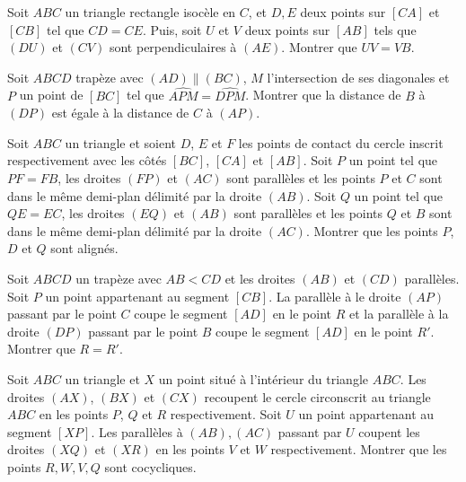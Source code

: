 \begin{exo}%
Soit $ABC$ un triangle rectangle isocèle en $C$, et $D,E$ deux points sur $[CA]$ et $[CB]$ tel que $CD = CE$. Puis, soit $U$ et $V$ deux points sur $[AB]$ tels que $(DU)$ et $(CV)$ sont perpendiculaires à $(AE)$. Montrer que $UV = VB$.
\end{exo}


\begin{exo}%
Soit $ABCD$ trapèze avec $(AD) \parallel (BC)$, $M$ l’intersection de ses diagonales et $P$ un point de $[BC]$ tel que $\widehat{APM} = \widehat{DPM}$. Montrer que la distance de $B$ à $(DP)$ est égale à la distance de $C$ à $(AP)$.
\end{exo}


\begin{exo}%
Soit $ABC$ un triangle et soient $D$, $E$ et $F$ les points de contact du cercle inscrit respectivement avec les côtés $[BC]$, $[CA]$ et $[AB]$. Soit $P$ un point tel que $PF = FB$, les droites $(FP)$ et $(AC)$ sont parallèles et les points $P$ et $C$ sont dans le même demi-plan délimité par la droite $(AB)$. Soit $Q$ un point tel que $QE = EC$, les droites $(EQ)$ et $(AB)$ sont parallèles et les points $Q$ et $B$ sont dans le même demi-plan délimité par la droite $(AC)$. Montrer que les points $P$, $D$ et $Q$ sont alignés.
\end{exo}


\begin{exo}
Soit $ABCD$ un trapèze avec $AB < CD$ et les droites $(AB)$ et $(CD)$ parallèles. Soit $P$ un point appartenant au segment $[CB]$. La parallèle à le droite $(AP)$ passant par le point $C$ coupe le segment $[AD]$ en le point $R$ et la parallèle à la droite $(DP)$ passant par le point $B$ coupe le segment $[AD]$ en le point $R'$. Montrer que $R = R'$.
\end{exo}


\begin{exo}%
Soit $ABC$ un triangle et $X$ un point situé à l'intérieur du triangle $ABC$. Les droites $(AX)$, $(BX)$ et $(CX)$ recoupent le cercle circonscrit au triangle $ABC$ en les points $P$, $Q$ et $R$ respectivement. Soit $U$ un point appartenant au segment $[XP]$. Les parallèles à $(AB),(AC)$ passant par $U$ coupent les droites $(XQ)$ et $(XR)$ en les points $V$ et $W$ respectivement. Montrer que les points $R,W,V,Q$ sont cocycliques.
\end{exo}


\newpage


